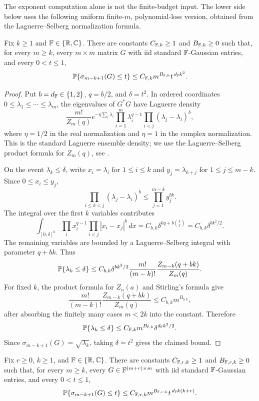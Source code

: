 The exponent computation alone is not the finite-budget input.  The lower side
below uses the following uniform finite-\(m\), polynomial-loss version, obtained
from the Laguerre--Selberg normalization formula.

\begin{lemma}\label{kth:laguerre-tail}
Fix \(k\ge1\) and \(\mathbb{F}\in\{\mathbb{R},\mathbb{C}\}\).  There are constants
\(C_{\mathbb{F},k}\ge1\) and \(B_{\mathbb{F},k}\ge0\) such that, for every \(m\ge k\), every
\(m\times m\) matrix \(G\) with iid standard \(\mathbb{F}\)-Gaussian entries, and every
\(0<t\le1\),
\[
  \mathbb{P}\{\sigma_{m-k+1}(G)\le t\}
  \le C_{\mathbb{F},k}m^{B_{\mathbb{F},k}}t^{\,d_{\mathbb{F}} k^2}.
\]
\end{lemma}

\begin{proof}
Put \(b=d_{\mathbb{F}}\in\{1,2\}\), \(q=b/2\), and \(\delta=t^2\).  In ordered
coordinates \(0\le\lambda_1\le\cdots\le\lambda_m\), the eigenvalues of \(G^*G\)
have Laguerre density
\[
  \frac{m!}{Z_m(q)}
  e^{-\eta\sum_i\lambda_i}
  \prod_{i=1}^m \lambda_i^{q-1}
  \prod_{i<j}(\lambda_j-\lambda_i)^b,
\]
where \(\eta=1/2\) in the real normalization and \(\eta=1\) in the complex
normalization.  This is the standard Laguerre ensemble density; we use the
Laguerre--Selberg product formula for \(Z_m(q)\), see
\cite[Chs.~3--4]{Forrester2010}.

On the event \(\lambda_k\le\delta\), write \(x_i=\lambda_i\) for
\(1\le i\le k\) and \(y_j=\lambda_{k+j}\) for \(1\le j\le m-k\).  Since
\(0\le x_i\le y_j\),
\[
  \prod_{i\le k<j}(\lambda_j-\lambda_i)^b
  \le \prod_{j=1}^{m-k} y_j^{bk}.
\]
The integral over the first \(k\) variables contributes
\[
  \int_{[0,\delta]^k}\prod_i x_i^{q-1}
        \prod_{i<j}|x_i-x_j|^b\,dx
  = C_{b,k}\delta^{kq+b\binom{k}{2}}
  = C_{b,k}\delta^{bk^2/2}.
\]
The remaining variables are bounded by a Laguerre--Selberg integral with
parameter \(q+bk\).  Thus
\[
  \mathbb{P}\{\lambda_k\le\delta\}
  \le
  C_{b,k}\delta^{bk^2/2}
  \frac{m!}{(m-k)!}\frac{Z_{m-k}(q+bk)}{Z_m(q)} .
\]
For fixed \(k\), the product formula for \(Z_n(a)\) and Stirling's formula
give
\[
  \frac{m!}{(m-k)!}\frac{Z_{m-k}(q+bk)}{Z_m(q)}
  \le C_{b,k}m^{B_{b,k}},
\]
after absorbing the finitely many cases \(m<2k\) into the constant.  Therefore
\[
  \mathbb{P}\{\lambda_k\le\delta\}
  \le C_{\mathbb{F},k}m^{B_{\mathbb{F},k}}\delta^{d_{\mathbb{F}} k^2/2}.
\]
Since \(\sigma_{m-k+1}(G)=\sqrt{\lambda_k}\), taking \(\delta=t^2\) gives the
claimed bound.
\end{proof}

\begin{lemma}\label{rect-kth:laguerre-tail}
Fix \(r\ge0\), \(k\ge1\), and \(\mathbb{F}\in\{\mathbb{R},\mathbb{C}\}\).  There are constants
\(C_{\mathbb{F},r,k}\ge1\) and \(B_{\mathbb{F},r,k}\ge0\) such that, for every \(m\ge k\),
every \(G\in\mathbb{F}^{(m+r)\times m}\) with iid standard \(\mathbb{F}\)-Gaussian entries,
and every \(0<t\le1\),
\[
  \mathbb{P}\{\sigma_{m-k+1}(G)\le t\}
  \le C_{\mathbb{F},r,k}m^{B_{\mathbb{F},r,k}}t^{\,d_{\mathbb{F}} k(k+r)}.
\]
\end{lemma}

